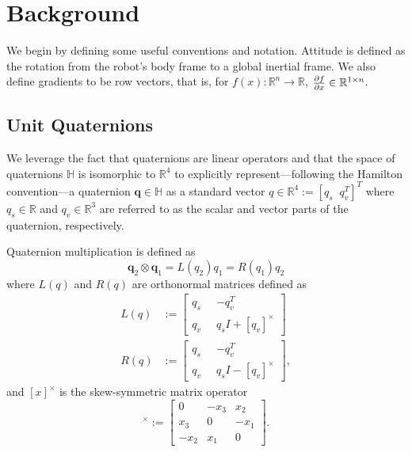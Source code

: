 \documentclass[letterpaper, 10 pt, conference]{ieeeconf}  %
\newcommand{\R}{\mathbb{R}}
\newcommand{\skewmat}[1]{[#1]^\times}
\newcommand{\q}{\textbf{q}}
\begin{document}
\section{Background}

    We begin by defining some useful conventions and notation. 
    Attitude is defined as the rotation from the robot's body frame to a global inertial 
        frame. 
    We also define gradients to be row vectors, that is, for 
        $f(x) : \R^n \to \R$, $\pdv{f}{x} \in \R^{1\times n}$.

    \subsection{Unit Quaternions} \label{sec:quaternions}
        We leverage the fact that quaternions are linear operators and that the space of 
        quaternions $\mathbb{H}$ is isomorphic to $\R^4$ to explicitly 
        represent---following the Hamilton convention---a quaternion $\q \in \mathbb{H}$ as 
        a standard vector $q \in \R^4 := [q_s \;\; q_v^T]^T$ where $q_s \in \R$ and 
        $q_v \in \R^3$ are referred to as the scalar and vector parts of the quaternion, respectively.
        
        Quaternion multiplication is defined as
        \begin{equation} \label{eq:quat_mult}
            \q_2 \otimes \q_1 = L(q_2) q_1 = R(q_1) q_2
        \end{equation}
        where $L(q)$ and $R(q)$ are orthonormal matrices defined as
        \begin{align}
            L(q) &:= \begin{bmatrix} 
                q_s \;\; & -q_v^T \\ 
                q_v \;\; & q_s I + \skewmat{q_v} 
            \end{bmatrix} 
            \label{eq:Lmult} \\
            R(q) &:=\begin{bmatrix} 
                q_s \;\; & -q_v^T \\ 
                q_v \;\; & q_s I - \skewmat{q_v} 
            \end{bmatrix} \label{eq:Rmult},
        \end{align}
        and $\skewmat{x}$ is the skew-symmetric matrix operator
        \begin{equation}
            \skewmat{x} := \begin{bmatrix} 
                0 & -x_3 & x_2 \\ 
                x_3 & 0 & -x_1\\ 
                -x_2 & x_1 & 0 
            \end{bmatrix}.
        \end{equation}
        
\end{document}
